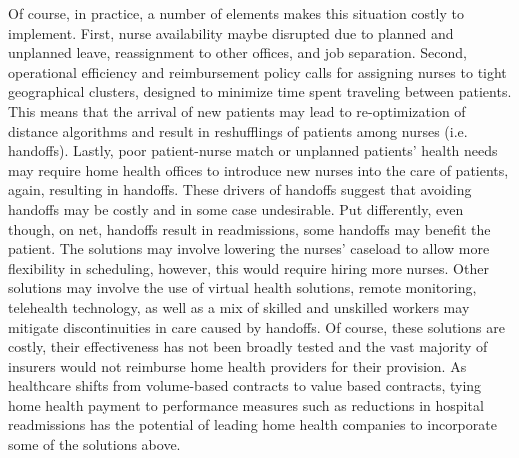 \documentclass[final,12pt, notitlepage]{article}
\newcommand{\myreferences}{/Users/kimk13/Dropbox/Research/dissertn_bib}
\begin{document}
Of course, in practice, a number of elements makes this situation costly to implement. First, nurse availability maybe disrupted due to planned and unplanned leave, reassignment to other offices, and job separation. Second, operational efficiency and reimbursement policy calls for assigning nurses to tight geographical clusters, designed to minimize time spent traveling between patients. This means that the arrival of new patients may lead to re-optimization of distance algorithms and result in reshufflings of patients among nurses (i.e. handoffs). Lastly, poor patient-nurse match or unplanned patients' health needs may require home health offices to introduce new nurses into the care of patients, again, resulting in handoffs. These drivers of handoffs suggest that avoiding handoffs may be costly and in some case undesirable. Put differently, even though, on net, handoffs result in readmissions, some handoffs may benefit the patient. The solutions may involve lowering the nurses' caseload to allow more flexibility in scheduling, however, this would require hiring more nurses. Other solutions may involve the use of virtual health solutions, remote monitoring, telehealth technology, as well as a mix of skilled and unskilled workers may mitigate discontinuities in care caused by handoffs. Of course, these solutions are costly, their effectiveness has not been broadly tested and the vast majority of insurers would not reimburse home health providers for their provision. As healthcare shifts from volume-based contracts to value based contracts, tying home health payment to performance measures such as reductions in hospital readmissions has the potential of leading home health companies to incorporate some of the solutions above.






\newpage

{}

\end{document}
